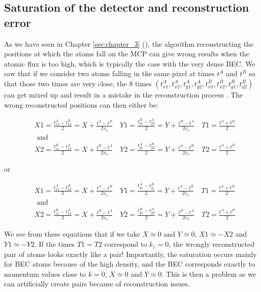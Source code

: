 \subsection{Saturation of the detector and reconstruction error}

As we have seen in Chapter \ref{sec:chapter_3} (), the algorithm reconstructing the positions at which the atoms fall on the MCP can give wrong results when the atomic flux is too high, which is typically the case with the very dense BEC. We saw that if we consider two atoms falling in the same pixel at times $t^A$ and  $t^B$ so that those two times are very close, the 8 times $(t_{x 1}^{A}, t_{x 2}^{A}, t_{y 1}^{A}, t_{y 2}^{A}, t_{x 1}^{B}, t_{x 2}^{B}, t_{y 1}^{B}, t_{y 2}^{B})$ can get mixed up and result in a mistake in the reconstruction process \cite{cayla_these}. The wrong reconstructed positions can then either be:

\begin{equation}
\begin{aligned}
&X 1=\frac{t_{x 1}^{A}-t_{x 2}^{B}}{2}=X+\frac{t^{A}-t^{B}}{2 v_{x}} \quad Y 1=\frac{t_{y 1}^{B}-t_{y 2}^{A}}{2}=Y+\frac{t^{B}-t^{A}}{2 v_{x}} \quad T 1=\frac{t^{A}+t^{B}}{2}\\
&\text { and }\\
&X 2=\frac{t_{x 1}^{B}-t_{x 2}^{A}}{2}=X+\frac{t^{B}-t^{A}}{2 v_{x}} \quad Y 2=\frac{t_{y 1}^{A}-t_{y 2}^{B}}{2}=Y+\frac{t^{A}-t^{B}}{2 v_{x}} \quad T 2=\frac{t^{A}+t^{B}}{2}
\end{aligned}
\end{equation}

\noindent or 

\begin{equation}
\begin{aligned}
&X 1=\frac{t_{x 1}^{A}-t_{x 2}^{B}}{2}=X+\frac{t^{A}-t^{B}}{2 v_{x}} \quad Y 1=\frac{t_{y 1}^{A}-t_{y_{2}}^{B}}{2}=Y+\frac{t^{A}-t^{B}}{2 v_{x}} \quad T 1=\frac{t^{A}+t^{B}}{2}\\
&\text { and }\\
&X 2=\frac{t_{x 1}^{B}-t_{x 2}^{A}}{2}=X+\frac{t^{B}-t^{A}}{2 v_{x}} \quad Y 2=\frac{t_{y 1}^{B}-t_{y 2}^{A}}{2}=Y+\frac{t^{B}-t^{A}}{2 v_{x}} \quad T 2=\frac{t^{A}+t^{B}}{2}
\end{aligned}
\end{equation}

\noindent We see from these equations that if we take $X \simeq 0$ and $Y \simeq 0$, $X1 \simeq -X2$ and $Y1 \simeq -Y2$. If the times $T1=T2$ correspond to $k_z=0$, the wrongly reconstructed pair of atoms looks exactly like a \kmk pair! Importantly, the saturation occurs mainly for BEC atoms because of the high density, and the BEC corresponds exactly to momentum values close to $k=0$, \ie  $X \simeq 0$ and $Y \simeq 0$. This is then a problem as we can artificially create \kmk pairs because of reconstruction issues.

